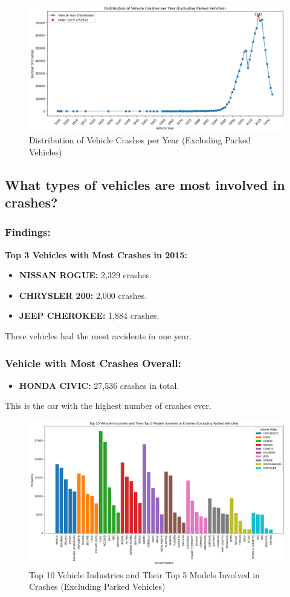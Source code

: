 \documentclass[a4paper,12pt]{article}
\begin{document}
\begin{figure}
    \centering
    \includegraphics[width=0.75\linewidth]{images/vehicle-crashes-per-year.png}
    \caption{Distribution of Vehicle Crashes per Year (Excluding Parked Vehicles)}
    \label{fig:3.4}
\end{figure}
\subsection{What types of vehicles are most involved in crashes?}

\subsubsection{Findings:}
\textbf{Top 3 Vehicles with Most Crashes in 2015:}
\begin{itemize}
    \item \textbf{NISSAN ROGUE:} 2,329 crashes.
    \item \textbf{CHRYSLER 200:} 2,000 crashes.
    \item \textbf{JEEP CHEROKEE:} 1,884 crashes.
\end{itemize}
These vehicles had the most accidents in one year.

\subsubsection{Vehicle with Most Crashes Overall:}
\begin{itemize}
    \item \textbf{HONDA CIVIC:} 27,536 crashes in total.
\end{itemize}
This is the car with the highest number of crashes ever.



\begin{figure}
    \centering
    \includegraphics[width=0.75\linewidth]{images/vehicle-industries-in-crashes.png}
    \caption{Top 10 Vehicle Industries and Their Top 5 Models Involved in Crashes (Excluding Parked Vehicles)}
    \label{fig:3.5}
\end{figure}
\end{document}
